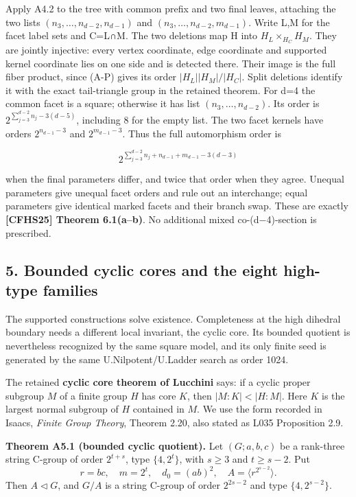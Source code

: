 \documentclass[
  11pt,
  a4paper,
]{article}
\begin{document}
Apply A4.2 to the tree with common prefix and two final leaves,
attaching the two lists \((n_3,\ldots,n_{d-2},n_{d-1})\) and
\((n_3,\ldots,n_{d-2},m_{d-1})\). Write L,M for the facet label sets and
C=L∩M. The two deletions map H into \(H_L\times_{H_C}H_M\). They are
jointly injective: every vertex coordinate, edge coordinate and
supported kernel coordinate lies on one side and is detected there.
Their image is the full fiber product, since (A-P) gives its order
\(|H_L||H_M|/|H_C|\). Split deletions identify it with the exact
tail-triangle group in the retained theorem. For d=4 the common facet is
a square; otherwise it has list \((n_3,\ldots,n_{d-2})\). Its order is
\(2^{\sum_{j=3}^{d-2}n_j-3(d-5)}\), including 8 for the empty list. The
two facet kernels have orders \(2^{n_{d-1}-3}\) and \(2^{m_{d-1}-3}\).
Thus the full automorphism order is

\[
 2^{\sum_{j=3}^{d-2}n_j+n_{d-1}+m_{d-1}-3(d-3)}
\]

when the final parameters differ, and twice that order when they agree.
Unequal parameters give unequal facet orders and rule out an
interchange; equal parameters give identical marked facets and their
branch swap. These are exactly \textbf{{[}CFHS25{]} Theorem 6.1(a--b)}.
No additional mixed co-(d−4)-section is prescribed.

\subsection{5. Bounded cyclic cores and the eight high-type
families}\label{bounded-cyclic-cores-and-the-eight-high-type-families}

The supported constructions solve existence. Completeness at the high
dihedral boundary needs a different local invariant, the cyclic core.
Its bounded quotient is nevertheless recognized by the same square
model, and its only finite seed is generated by the same
U.Nilpotent/U.Ladder search as order 1024.

The retained \textbf{cyclic core theorem of Lucchini} says: if a cyclic
proper subgroup \(M\) of a finite group \(H\) has core \(K\), then
\(|M:K|<|H:M|\). Here \(K\) is the largest normal subgroup of \(H\)
contained in \(M\). We use the form recorded in Isaacs, \emph{Finite
Group Theory}, Theorem 2.20, also stated as L035 Proposition 2.9.

\textbf{Theorem A5.1 (bounded cyclic quotient).} Let \((G;a,b,c)\) be a
rank-three string C-group of order \(2^{t+s}\), type \(\{4,2^t\}\), with
\(s\ge3\) and \(t\ge s-2\). Put \[
 r=bc,\quad m=2^t,\quad d_0=(ab)^2,\quad
 A=\langle r^{2^{s-2}}\rangle.
\] Then \(A\lhd G\), and \(G/A\) is a string C-group of order
\(2^{2s-2}\) and type \(\{4,2^{s-2}\}\).
\end{document}

